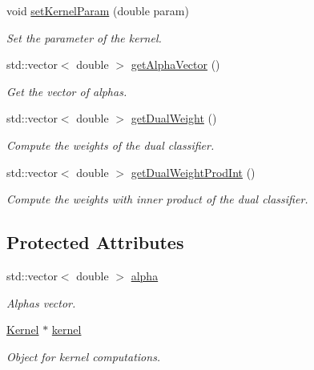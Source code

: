 \begin{DoxyCompactItemize}
void \mbox{\hyperlink{class_dual_classifier_a1eaa47dfe556a9c0ecb05cd82324c337}{set\+Kernel\+Param}} (double param)
\begin{DoxyCompactList}\small\item\em Set the parameter of the kernel. \end{DoxyCompactList}\item 
std\+::vector$<$ double $>$ \mbox{\hyperlink{class_dual_classifier_a9ce7228ddbdf6886782e2d1abf9bb0a9}{get\+Alpha\+Vector}} ()
\begin{DoxyCompactList}\small\item\em Get the vector of alphas. \end{DoxyCompactList}\item 
std\+::vector$<$ double $>$ \mbox{\hyperlink{class_dual_classifier_a179729f872fe280d752089c571187fbf}{get\+Dual\+Weight}} ()
\begin{DoxyCompactList}\small\item\em Compute the weights of the dual classifier. \end{DoxyCompactList}\item 
std\+::vector$<$ double $>$ \mbox{\hyperlink{class_dual_classifier_a2780174d195acdfc2d3c9777c48e818c}{get\+Dual\+Weight\+Prod\+Int}} ()
\begin{DoxyCompactList}\small\item\em Compute the weights with inner product of the dual classifier. \end{DoxyCompactList}\end{DoxyCompactItemize}
\subsection*{Protected Attributes}
\begin{DoxyCompactItemize}
\item 
\mbox{\label{class_dual_classifier_a204d0e925be1450c97dd8635b8c9f3e9}} 
std\+::vector$<$ double $>$ \mbox{\hyperlink{class_dual_classifier_a204d0e925be1450c97dd8635b8c9f3e9}{alpha}}
\begin{DoxyCompactList}\small\item\em Alphas vector. \end{DoxyCompactList}\item 
\mbox{\label{class_dual_classifier_a40c32ed2991c8545d50ef5fe57611c28}} 
\mbox{\hyperlink{class_kernel}{Kernel}} $\ast$ \mbox{\hyperlink{class_dual_classifier_a40c32ed2991c8545d50ef5fe57611c28}{kernel}}
\begin{DoxyCompactList}\small\item\em Object for kernel computations. \end{DoxyCompactList}\end{DoxyCompactItemize}


